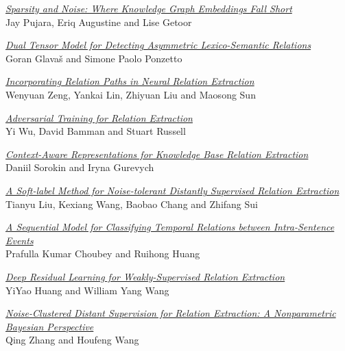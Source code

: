 \hyperlink{page.1750}{\em Sparsity and Noise: Where Knowledge Graph Embeddings Fall Short}\samepage \\
\hspace*{7mm} Jay Pujara, Eriq Augustine and Lise Getoor\dotfill {}

\hyperlink{page.1756}{\em Dual Tensor Model for Detecting Asymmetric Lexico-Semantic Relations}\samepage \\
\hspace*{7mm} Goran Glava\v{s} and Simone Paolo Ponzetto\dotfill {}

\hyperlink{page.1767}{\em Incorporating Relation Paths in Neural Relation Extraction}\samepage \\
\hspace*{7mm} Wenyuan Zeng, Yankai Lin, Zhiyuan Liu and Maosong Sun\dotfill {}

\hyperlink{page.1777}{\em Adversarial Training for Relation Extraction}\samepage \\
\hspace*{7mm} Yi Wu, David Bamman and Stuart Russell\dotfill {}

\hyperlink{page.1784}{\em Context-Aware Representations for Knowledge Base Relation Extraction}\samepage \\
\hspace*{7mm} Daniil Sorokin and Iryna Gurevych\dotfill {}

\hyperlink{page.1790}{\em A Soft-label Method for Noise-tolerant Distantly Supervised Relation Extraction}\samepage \\
\hspace*{7mm} Tianyu Liu, Kexiang Wang, Baobao Chang and Zhifang Sui\dotfill {}

\hyperlink{page.1796}{\em A Sequential Model for Classifying Temporal Relations between Intra-Sentence Events}\samepage \\
\hspace*{7mm} Prafulla Kumar Choubey and Ruihong Huang\dotfill {}

\hyperlink{page.1803}{\em Deep Residual Learning for Weakly-Supervised Relation Extraction}\samepage \\
\hspace*{7mm} YiYao Huang and William Yang Wang\dotfill {}

\hyperlink{page.1808}{\em Noise-Clustered Distant Supervision for Relation Extraction: A Nonparametric Bayesian Perspective}\samepage \\
\hspace*{7mm} Qing Zhang and Houfeng Wang\dotfill {}


